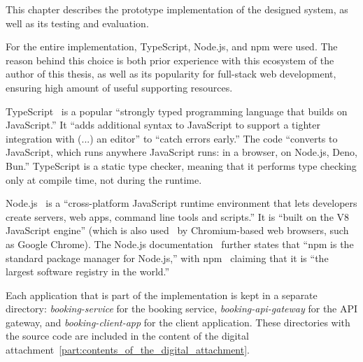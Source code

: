 This chapter describes the prototype implementation of the designed system, as well as its testing and evaluation.

For the entire implementation, TypeScript, Node.js, and npm were used. The reason behind this choice is both prior experience with this ecosystem of the author of this thesis, as well as its popularity for full-stack web development, ensuring high amount of useful supporting resources.

TypeScript~\cite{typescript} is a popular \enquote{strongly typed programming language that builds on JavaScript.} It \enquote{adds additional syntax to JavaScript to support a tighter integration with (...) an editor} to \enquote{catch errors early.} The code \enquote{converts to JavaScript, which runs anywhere JavaScript runs: in a browser, on Node.js, Deno, Bun.} TypeScript is a static type checker, meaning that it performs type checking only at compile time, not during the runtime.

\begin{sloppypar}
Node.js~\cite{node_js} is a \enquote{cross-platform JavaScript runtime environment that lets developers create servers, web apps, command line tools and scripts.} It is \enquote{built on the V8 JavaScript engine} (which is also used~\cite{v8} by Chromium-based web browsers, such as Google Chrome). The Node.js documentation~\cite{node_js} further states that \enquote{npm is the standard package manager for Node.js,} with npm~\cite{npm} claiming that it is \enquote{the largest software registry in the world.}
\end{sloppypar}

Each application that is part of the implementation is kept in a separate directory: \textit{booking-service} for the booking service, \textit{booking-api-gateway} for the API gateway, and \textit{booking-client-app} for the client application. These directories with the source code are included in the content of the digital attachment~\ref{part:contents_of_the_digital_attachment}.


